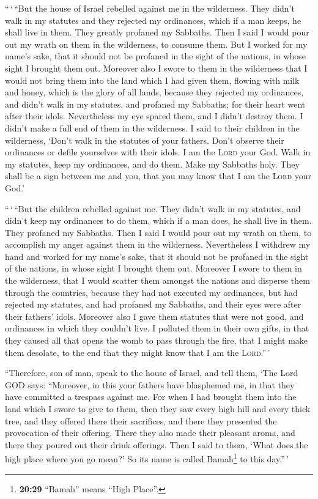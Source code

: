  ``\,`\,``But the house of Israel rebelled against me in
the wilderness. They didn't walk in my statutes and they rejected my
ordinances, which if a man keeps, he shall live in them. They greatly
profaned my Sabbaths. Then I said I would pour out my wrath on them in
the wilderness, to consume them.  But I worked for my
name's sake, that it should not be profaned in the sight of the nations,
in whose sight I brought them out.  Moreover also I swore
to them in the wilderness that I would not bring them into the land
which I had given them, flowing with milk and honey, which is the glory
of all lands,  because they rejected my ordinances, and
didn't walk in my statutes, and profaned my Sabbaths; for their heart
went after their idols.  Nevertheless my eye spared them,
and I didn't destroy them. I didn't make a full end of them in the
wilderness.  I said to their children in the wilderness,
`Don't walk in the statutes of your fathers. Don't observe their
ordinances or defile yourselves with their idols.  I am
the \textsc{Lord} your God. Walk in my statutes, keep my ordinances, and
do them.  Make my Sabbaths holy. They shall be a sign
between me and you, that you may know that I am the \textsc{Lord} your
God.'

 ``\,`\,``But the children rebelled against me. They
didn't walk in my statutes, and didn't keep my ordinances to do them,
which if a man does, he shall live in them. They profaned my Sabbaths.
Then I said I would pour out my wrath on them, to accomplish my anger
against them in the wilderness.  Nevertheless I withdrew
my hand and worked for my name's sake, that it should not be profaned in
the sight of the nations, in whose sight I brought them out.
 Moreover I swore to them in the wilderness, that I would
scatter them amongst the nations and disperse them through the
countries,  because they had not executed my ordinances,
but had rejected my statutes, and had profaned my Sabbaths, and their
eyes were after their fathers' idols.  Moreover also I
gave them statutes that were not good, and ordinances in which they
couldn't live.  I polluted them in their own gifts, in
that they caused all that opens the womb to pass through the fire, that
I might make them desolate, to the end that they might know that I am
the \textsc{Lord}.''\,'

 ``Therefore, son of man, speak to the house of Israel,
and tell them, `The Lord GOD says: ``Moreover, in this your fathers have
blasphemed me, in that they have committed a trespass against me.
 For when I had brought them into the land which I swore
to give to them, then they saw every high hill and every thick tree, and
they offered there their sacrifices, and there they presented the
provocation of their offering. There they also made their pleasant
aroma, and there they poured out their drink offerings. 
Then I said to them, `What does the high place where you go mean?' So
its name is called Bamah\footnote{\textbf{20:29} ``Bamah'' means ``High
  Place''.} to this day.''\,'

